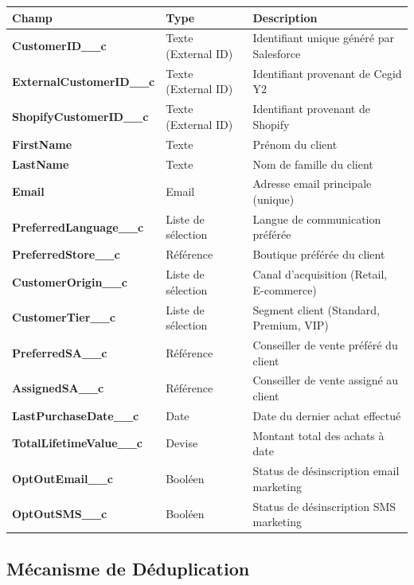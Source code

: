 \begin{center}
\begin{tabular}{|>{\bfseries}p{5.5cm}|p{4cm}|p{5.5cm}|}
\hline
\rowcolor{lightblue} Champ & Type & Description \\
\hline
CustomerID\_\_c & Texte (External ID) & Identifiant unique généré par Salesforce \\
\hline
ExternalCustomerID\_\_c & Texte (External ID) & Identifiant provenant de Cegid Y2 \\
\hline
ShopifyCustomerID\_\_c & Texte (External ID) & Identifiant provenant de Shopify \\
\hline
FirstName & Texte & Prénom du client \\
\hline
LastName & Texte & Nom de famille du client \\
\hline
Email & Email & Adresse email principale (unique) \\
\hline
PreferredLanguage\_\_c & Liste de sélection & Langue de communication préférée \\
\hline
PreferredStore\_\_c & Référence & Boutique préférée du client \\
\hline
CustomerOrigin\_\_c & Liste de sélection & Canal d'acquisition (Retail, E-commerce) \\
\hline
CustomerTier\_\_c & Liste de sélection & Segment client (Standard, Premium, VIP) \\
\hline
PreferredSA\_\_c & Référence & Conseiller de vente préféré du client \\
\hline
AssignedSA\_\_c & Référence & Conseiller de vente assigné au client \\
\hline
LastPurchaseDate\_\_c & Date & Date du dernier achat effectué \\
\hline
TotalLifetimeValue\_\_c & Devise & Montant total des achats à date \\
\hline
OptOutEmail\_\_c & Booléen & Status de désinscription email marketing \\
\hline
OptOutSMS\_\_c & Booléen & Status de désinscription SMS marketing \\
\hline
\end{tabular}
\end{center}

\newpage

\subsection{Mécanisme de Déduplication}

